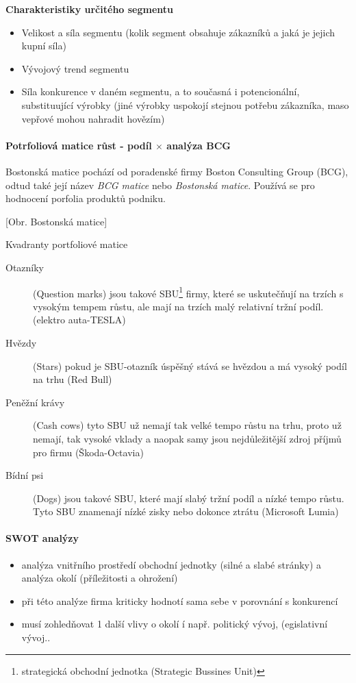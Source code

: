 \documentclass[11pt,a4paper,twoside]{book}
\begin{document}
	\textbf{Charakteristiky určitého segmentu}
	\begin{itemize}
		\item Velikost a síla segmentu (kolik segment obsahuje zákazníků a jaká je jejich kupní síla)
		\item Vývojový trend segmentu
		\item Síla konkurence v daném segmentu, a to současná i potencionální, substituující výrobky (jiné výrobky uspokojí stejnou potřebu zákazníka, maso vepřové mohou nahradit hovězím)
	\end{itemize}

	\paragraph*{Potrfoliová matice růst - podíl $\times$ analýza BCG}
	
	Bostonská matice pochází od poradenské firmy Boston Consulting Group (BCG), odtud také její název \emph{BCG matice} nebo \emph{Bostonská matice}. Používá se pro hodnocení porfolia produktů podniku.

	[Obr. Bostonská matice]

	Kvadranty portfoliové matice
	\begin{description}
		\item[Otazníky] (Question marks) jsou takové SBU\footnote{strategická obchodní jednotka (Strategic Bussines Unit)} firmy, které se uskutečňují na trzích s vysokým tempem růstu, ale mají na trzích malý relativní tržní podíl. (elektro auta-TESLA)
		\item[Hvězdy] (Stars) pokud je SBU-otazník úspěšný stává se hvězdou a má vysoký podíl na trhu (Red Bull)
		\item[Peněžní krávy] (Cash cows) tyto SBU už nemají tak velké tempo růstu na trhu, proto už nemají, tak vysoké vklady a naopak samy jsou nejdůležitější zdroj příjmů pro firmu (Škoda-Octavia)
		\item[Bídní psi] (Dogs) jsou takové SBU, které mají slabý tržní podíl a nízké tempo růstu. Tyto SBU znamenají nízké zisky nebo dokonce ztrátu (Microsoft Lumia)
	\end{description}

	\paragraph*{SWOT analýzy}
	\begin{itemize}
		\item analýza vnitřního prostředí obchodní jednotky (silné a slabé stránky) a analýza okolí (příležitosti a ohrožení)
		\item při této analýze firma kriticky hodnotí sama sebe v porovnání s konkurencí
		\item musí zohledňovat 1 další vlivy o okolí í např. politický vývoj, (egislativní vývoj..
	\end{itemize}
\end{document}
